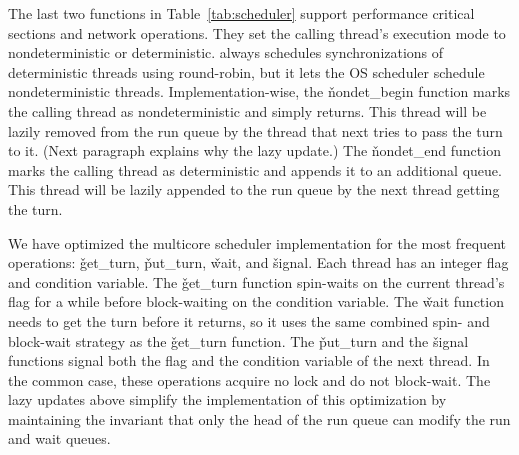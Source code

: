 The last two functions in Table~\ref{tab:scheduler} support performance
critical sections and network operations.  They set the calling thread's
execution mode to nondeterministic or deterministic. \xxx always schedules
synchronizations of deterministic threads using round-robin, but it lets
the OS scheduler schedule nondeterministic threads.
Implementation-wise, the \v{nondet\_begin} function marks the calling
thread as nondeterministic and simply returns.  This thread will be lazily
removed from the run queue by the thread that next tries to pass the turn to it.
(Next paragraph explains why the lazy update.)
The \v{nondet\_end} function marks the calling thread as deterministic and
appends it to an additional queue.  This thread will be lazily appended to
the run queue by the next thread getting the turn.

We have optimized the multicore scheduler implementation for the most frequent
operations: \v{get\_turn}, \v{put\_turn}, \v{wait}, and \v{signal}.  Each
thread has an integer flag and condition variable. The \v{get\_turn} function
spin-waits on the current thread's flag for a while before block-waiting
on the condition variable. The \v{wait} function needs to get the turn before it
returns, so it uses the same combined spin- and block-wait strategy as
the \v{get\_turn} function. The \v{put\_turn} and the 
\v{signal} functions signal both the flag and the
condition variable of the next thread.  In the common case, these
operations acquire no lock and do not block-wait.  The lazy updates above
simplify the implementation of this optimization by maintaining the
invariant that only the head of the run queue can modify the run and wait
queues.


